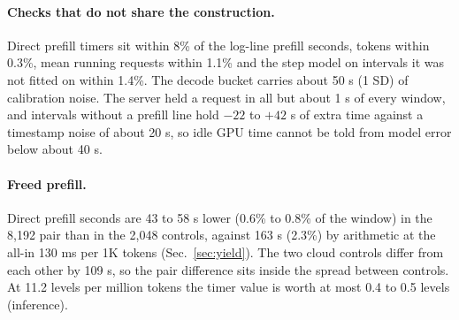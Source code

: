 \begin{table}[!htb]
\caption{Stream time as a share of 100,800 stream-seconds (14 streams). The ``waiting'' row assumes prefill and decode batches do not overlap on the GPU. The two last rows split the ``no request'' row.}\label{tab:slots}
\centering\footnotesize
\setlength{\tabcolsep}{3pt}
\end{table}

\paragraph{Checks that do not share the construction.}
Direct prefill timers sit within 8\% of the log-line prefill seconds, tokens within 0.3\%, mean running requests within 1.1\% and the step model on intervals it was not fitted on within 1.4\%. The decode bucket carries about 50 s (1 SD) of calibration noise. %
The server held a request in all but about 1 s of every window, and intervals without a prefill line hold $-22$ to $+42$ s of extra time against a timestamp noise of about 20 s, so idle GPU time cannot be told from model error below about 40 s. %

\paragraph{Freed prefill.}
Direct prefill seconds are 43 to 58 s lower (0.6\% to 0.8\% of the window) in the 8,192 pair than in the 2,048 controls, against 163 s (2.3\%) by arithmetic at the all-in 130 ms per 1K tokens (Sec.~\ref{sec:yield}). %
The two cloud controls differ from each other by 109 s, so the pair difference sits inside the spread between controls. At 11.2 levels per million tokens the timer value is worth at most 0.4 to 0.5 levels (inference). %

